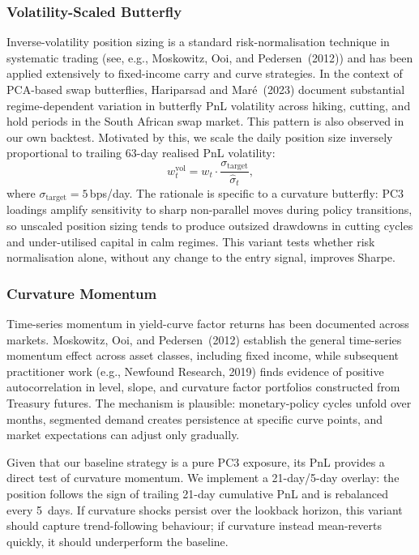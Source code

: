 \documentclass[11pt,a4paper]{article}
\begin{document}
\subsubsection{Volatility-Scaled Butterfly}
Inverse-volatility position sizing is a standard risk-normalisation technique
in systematic trading (see, e.g., Moskowitz, Ooi, and Pedersen~(2012)) and
has been applied extensively to fixed-income carry and curve strategies.
In the context of PCA-based swap butterflies, Hariparsad and
Mar\'{e}~(2023) document substantial regime-dependent variation in butterfly
PnL volatility across hiking, cutting, and hold periods in the South African
swap market. This pattern is also observed in our own backtest. Motivated by
this, we scale the daily position size inversely proportional to trailing
63-day realised PnL volatility:
\begin{equation}
w_t^{\text{vol}} = w_t \cdot \frac{\sigma_{\text{target}}}{\hat\sigma_{t}},
\end{equation}
where $\sigma_{\text{target}} = 5$\,bps/day.  The rationale is specific to a
curvature butterfly: PC3 loadings amplify sensitivity to sharp
non-parallel moves during policy transitions, so unscaled position sizing
tends to produce outsized drawdowns in cutting cycles and under-utilised
capital in calm regimes.  This variant tests whether risk normalisation
alone, without any change to the entry signal, improves Sharpe.

\subsubsection{Curvature Momentum}
Time-series momentum in yield-curve factor returns has been documented
across markets.  Moskowitz, Ooi, and Pedersen~(2012) establish the
general time-series momentum effect across asset classes, including
fixed income, while subsequent practitioner work (e.g., Newfound
Research, 2019) finds evidence of positive autocorrelation in level,
slope, and curvature factor portfolios constructed from Treasury
futures.  The mechanism is plausible: monetary-policy cycles unfold
over months, segmented demand creates persistence at specific curve
points, and market expectations can adjust only gradually.

Given that our baseline strategy is a pure PC3 exposure, its PnL
provides a direct test of curvature momentum.  We implement a
21-day/5-day overlay: the position follows the sign of trailing 21-day
cumulative PnL and is rebalanced every 5~days.  If curvature shocks
persist over the lookback horizon, this variant should capture
trend-following behaviour; if curvature instead mean-reverts quickly,
it should underperform the baseline.
\end{document}
